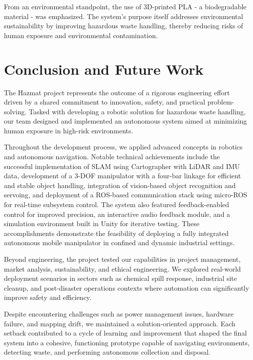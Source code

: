 \documentclass{article}
\begin{document}
From an environmental standpoint, the use of 3D-printed PLA - a biodegradable material - was emphasized. The system's purpose itself addresses environmental sustainability by improving hazardous waste handling, thereby reducing risks of human exposure and environmental contamination. 

\section{Conclusion and Future Work}

The Hazmat project represents the outcome of a rigorous engineering effort driven by a shared commitment to innovation, safety, and practical problem-solving. Tasked with developing a robotic solution for hazardous waste handling, our team designed and implemented an autonomous system aimed at minimizing human exposure in high-risk environments.

Throughout the development process, we applied advanced concepts in robotics and autonomous navigation. Notable technical achievements include the successful implementation of SLAM using Cartographer with LiDAR and IMU data, development of a 3-DOF manipulator with a four-bar linkage for efficient and stable object handling, integration of vision-based object recognition and servoing, and deployment of a ROS-based communication stack using micro-ROS for real-time subsystem control. The system also featured feedback-enabled control for improved precision, an interactive audio feedback module, and a simulation environment built in Unity for iterative testing. These accomplishments demonstrate the feasibility of deploying a fully integrated autonomous mobile manipulator in confined and dynamic industrial settings.

Beyond engineering, the project tested our capabilities in project management, market analysis, sustainability, and ethical engineering. We explored real-world deployment scenarios in sectors such as chemical spill response, industrial site cleanup, and post-disaster operations contexts where automation can significantly improve safety and efficiency.

Despite encountering challenges such as power management issues, hardware failure, and mapping drift, we maintained a solution-oriented approach. Each setback contributed to a cycle of learning and improvement that shaped the final system into a cohesive, functioning prototype capable of navigating environments, detecting waste, and performing autonomous collection and disposal.
\end{document}
